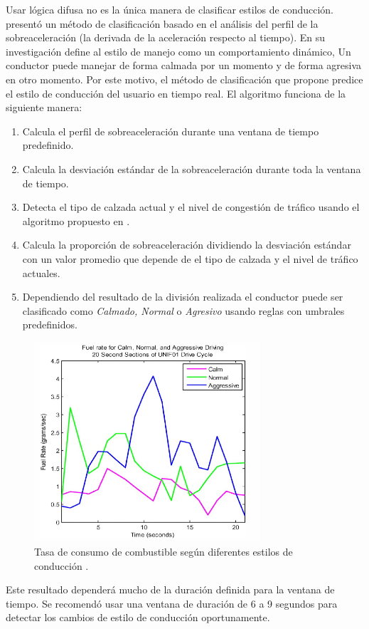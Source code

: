 Usar lógica difusa no es la única manera de clasificar estilos de conducción. \citeauthor{4938719} \cite{4938719} presentó un método de clasificación basado en el análisis del perfil de la sobreaceleración (la derivada de la aceleración respecto al tiempo). En su investigación define al estilo de manejo como un comportamiento dinámico, Un conductor puede manejar de forma calmada por un momento y de forma agresiva en otro momento. Por este motivo, el método de clasificación que propone predice el estilo de conducción del usuario en tiempo real.
El algoritmo funciona de la siguiente manera:
\begin{enumerate}
    \itemsep0em
    \item Calcula el perfil de sobreaceleración durante una ventana de tiempo predefinido.
    \item Calcula la desviación estándar de la sobreaceleración durante toda la ventana de tiempo.
    \item Detecta el tipo de calzada actual y el nivel de congestión de tráfico usando el algoritmo propuesto en \cite{Highway_cap_manual}.
    \item Calcula la proporción de sobreaceleración dividiendo la desviación estándar con un valor promedio que depende de el tipo de calzada y el nivel de tráfico actuales.
    \item Dependiendo del resultado de la división realizada el conductor puede ser clasificado como {\it Calmado, Normal} o {\it Agresivo} usando reglas con umbrales predefinidos.
\end{enumerate}
\begin{figure}[htbp!]
\centering
\includegraphics[width=0.75\textwidth]{Fig3}
\caption[Tasa de consumo de combustible según diferentes estilos de conducción]{Tasa de consumo de combustible según diferentes estilos de conducción \cite{4938719}.}
\label{fig:2.3}
\end{figure}
Este resultado dependerá mucho de la duración definida para la ventana de tiempo. Se recomendó usar una ventana de duración de 6 a 9 segundos para detectar los cambios de estilo de conducción oportunamente.

